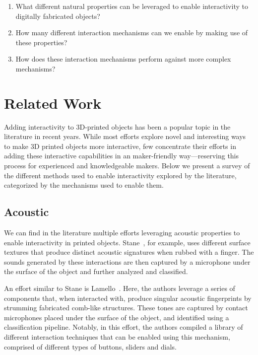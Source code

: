     \begin{enumerate}
      \item What different natural properties can be leveraged to enable
        interactivity to digitally fabricated objects?
      \item How many different interaction mechanisms can we enable by making
        use of these properties?
      \item How does these interaction mechanisms perform against more complex
        mechanisms?
    \end{enumerate}

  \section{Related Work}
    Adding interactivity to 3D-printed objects has been a popular topic in the
    literature in recent years. While most efforts explore novel and
    interesting ways to make 3D printed objects more interactive, few
    concentrate their efforts in adding these interactive capabilities in an
    maker-friendly way---reserving this process for experienced and
    knowledgeable makers. Below we present a survey of the different methods
    used to enable interactivity explored by the literature, categorized by the
    mechanisms used to enable them.

    \subsection{Acoustic}
      We can find in the literature multiple efforts leveraging acoustic
      properties to enable interactivity in printed objects.
      Stane~\cite{MurraySmith:2008ch}, for example, uses different surface
      textures that produce distinct acoustic signatures when rubbed with a
      finger. The sounds generated by these interactions are then captured by a
      microphone under the surface of the object and further analyzed and
      classified.

      An effort similar to Stane is Lamello~\cite{Savage:2015cs}.  Here, the
      authors leverage a series of components that, when interacted with,
      produce singular acoustic fingerprints by strumming fabricated comb-like
      structures. These tones are captured by contact microphones placed under
      the surface of the object, and identified using a classification
      pipeline. Notably, in this effort, the authors compiled a library of
      different interaction techniques that can be enabled using this
      mechanism, comprised of different types of buttons, sliders and dials.

